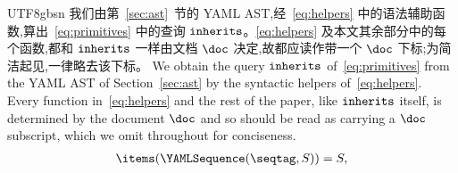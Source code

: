 \begin{CJK*}{UTF8}{gbsn}
\ifPaperChinese
我们由第~\ref{sec:ast}~节的 YAML AST,经~\eqref{eq:helpers} 中的语法辅助函数,算出~\eqref{eq:primitives} 中的查询 $\mathtt{inherits}$。\eqref{eq:helpers} 及本文其余部分中的每个函数,都和 $\mathtt{inherits}$ 一样由文档 $\doc$ 决定,故都应读作带一个 $\doc$ 下标;为简洁起见,一律略去该下标。
\else
We obtain the query $\mathtt{inherits}$ of~\eqref{eq:primitives} from the YAML
AST of Section~\ref{sec:ast} by the syntactic helpers of~\eqref{eq:helpers}.
Every function in~\eqref{eq:helpers} and the rest of the paper, like $\mathtt{inherits}$ itself, is
determined by the document $\doc$ and so should be read as carrying a $\doc$ subscript, which we
omit throughout for conciseness.
\fi
\begin{equation}\label{eq:helpers}
\begin{aligned}
  \items(\YAMLSequence(\seqtag, S)) &= S, \\

\end{aligned}
\end{equation}
\end{CJK*}
